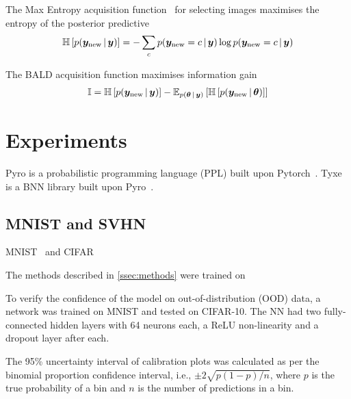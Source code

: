 \documentclass[10pt,a4paper,twocolumn]{article}
\begin{document}
The Max Entropy acquisition function~\cite{gal2017deep,shannon1948mathematical} for selecting images maximises the entropy of the posterior predictive
\begin{align}
    \mathbb{H}\left[p(\bm y_{\text{new}} \, | \, \bm y)\right] = -\sum_c p(\bm y_{\text{new}} = c \, | \, \bm y) \log p(\bm y_{\text{new}} = c \, | \, \bm y)
\end{align}

The BALD acquisition function maximises information gain
\begin{align}
    \mathbb{I} = \mathbb{H}\left[p(\bm y_{\text{new}} \, | \, \bm y)\right] - \mathbb{E}_{p(\bm \theta \, | \, \bm y)}\left[\mathbb{H}\left[p(\bm y_{\text{new}} \, | \, \bm \theta)\right]\right]
\end{align}

\section{Experiments}

\cite{paszke2019pytorch}
Pyro is a probabilistic programming language (PPL) built upon Pytorch~\cite{bingham2018pyro}.
Tyxe is a BNN library built upon Pyro~\cite{ritter2021tyxe}.

\subsection{MNIST and SVHN}\label{ssec:exp-mnist}

MNIST~\cite{lecun1998gradient} and CIFAR~\cite{krizhevsky2009learning}

The methods described in \cref{ssec:methods} were trained on

To verify the confidence of the model on out-of-distribution (OOD) data, a network was trained on MNIST and tested on CIFAR-10.
The NN had two fully-connected hidden layers with 64 neurons each, a ReLU non-linearity and a dropout layer after each.

The 95\% uncertainty interval of calibration plots was calculated as per the binomial proportion confidence interval, i.e., \(\pm 2 \sqrt{p (1-p) / n}\), where \(p\) is the true probability of a bin and \(n\) is the number of predictions in a bin.
\end{document}
